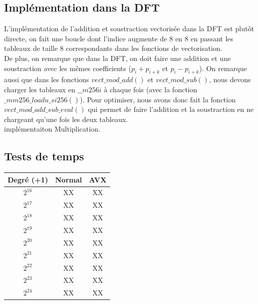\documentclass[12pt, a4paper]{article}
\begin{document}
\subsection{Implémentation dans la DFT}

L'implémentation de l'addition et soustraction vectorisée dans la DFT est plutôt directe, on fait une boucle dont l'indice augmente de 8 en 8 en passant les tableaux de taille 8 correspondants dans les fonctions de vectorisation. \\
De plus, on remarque que dans la DFT, on doit faire une addition et une soustraction avec les mêmes coefficients ($p_i+p_{i+k}$ et $p_i-p_{i+k}$). On remarque aussi que dans les fonctions $vect\_mod\_add()$ et $vect\_mod\_sub()$, nous devons charger les tableaux en $\_\_m256i$ à chaque fois (avec la fonction $\_mm256\_loadu\_si256()$). Pour optimiser, nous avons donc fait la fonction $vect\_mod\_add\_sub\_eval()$ qui permet de faire l'addition et la soustraction en ne chargeant qu'une fois les deux tableaux. \\
implémentaiton Multiplication.

\subsection{Tests de temps}

\begin{center}
\begin{tabular}{||c c c||}
\hline
Degré (+1) & Normal & AVX \\
\hline\hline
$2^{16}$ & XX & XX \\
\hline
$2^{17}$ & XX & XX \\
\hline
$2^{18}$ & XX & XX \\
\hline
$2^{19}$ & XX & XX \\
\hline
$2^{20}$ & XX & XX \\
\hline
$2^{21}$ & XX & XX \\
\hline
$2^{22}$ & XX & XX \\
\hline
$2^{23}$ & XX & XX \\
\hline
$2^{24}$ & XX & XX \\
\hline
\end{tabular}
\end{center}
\end{document}
